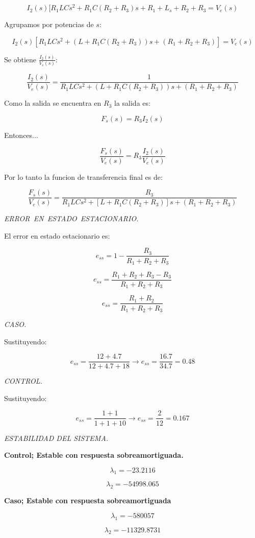 \documentclass{article}%
\begin{document}
\[
I_{2}(s)[R_{1}LCs^{2}+R_{1}C(R_{2}+R_{3})s+R_{1}+L_{s}+R_{2}+R_{3}%
=V_{e}\left(  s\right)
\]


Agrupamos por potencias de $s:$%

\[
I_{2}(s)[R_{1}LCs^{2}+(L+R_{1}C(R_{2}+R_{3}))s+(R_{1}+R_{2}+R_{3}%
)]=V_{e}\left(  s\right)
\]


Se obtiene $\frac{I_{2}(s)}{V_{e}\left(  s\right)  }:$%

\[
\frac{I_{2}(s)}{V_{e}\left(  s\right)  }=\frac{1}{R_{1}LCs^{2}+(L+R_{1}%
C(R_{2}+R_{3}))s+(R_{1}+R_{2}+R_{3})}
\]


Como la salida se encuentra en $R_{3}$ la salida es:%

\[
F_{s}(s)=R_{3}I_{2}\left(  s\right)
\]


Entonces...%

\[
\frac{F_{s}(s)}{V_{e}(s)}=R_{3}\frac{I_{2}(s)}{V_{e}(s)}
\]


Por lo tanto la funcion de transferencia final es de:%

\[
\frac{F_{s}(s)}{V_{e}(s)}=\frac{R_{3}}{R_{1}LCs^{2}+[L+R_{1}C(R_{2}%
+R_{3})]s+(R_{1}+R_{2}+R_{3})}
\]


\bigskip

\emph{ERROR\ EN\ ESTADO\ ESTACIONARIO.}

El error en estado estacionario es:%

\[
e_{ss}=1-\frac{R_{3}}{R_{1}+R_{2}+R_{3}}
\]
%

\[
e_{ss}=\frac{R_{1}+R_{2}+R_{3}-R_{3}}{R_{1}+R_{2}+R_{3}}
\]
%

\[
e_{ss}=\frac{R_{1}+R_{2}}{R_{1}+R_{2}+R_{3}}
\]


\emph{CASO.}

Sustituyendo:%

\[
e_{ss}=\frac{12+4.7}{12+4.7+18}\rightarrow e_{ss}=\frac{16.7}{34.7}=0.48
\]


\emph{CONTROL.}

Sustituyendo:%

\[
e_{ss}=\frac{1+1}{1+1+10}\rightarrow e_{ss}=\frac{2}{12}=0.167
\]


\emph{ESTABILIDAD DEL SISTEMA.}

\textbf{Control; Estable con respuesta sobreamortiguada.}%

\[
\lambda_{1}=-23.2116
\]
%

\[
\lambda_{2}=-54998.065
\]


\textbf{Caso; Estable con respuesta sobreamortiguada}%

\[
\lambda_{1}=-580057
\]
%

\[
\lambda_{2}=-11329.8731
\]
\end{document}
